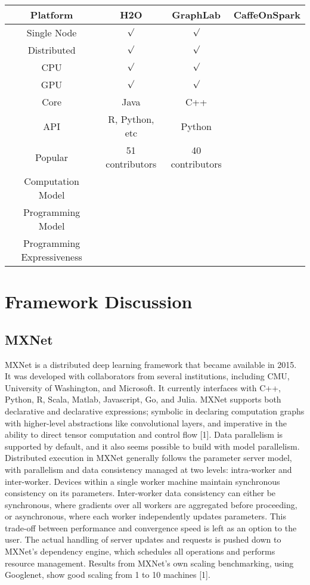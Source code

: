 \documentclass{article}
\begin{document}
\begin{tabular}{|c|c|c|c|}
\hline
Platform & H2O & GraphLab & CaffeOnSpark \\
\hline
Single Node & ${\surd}$ & ${\surd}$ &  \\
\hline
Distributed & ${\surd}$ & ${\surd}$ &  \\
\hline
CPU & ${\surd}$ & ${\surd}$ &  \\
\hline
GPU & ${\surd}$ & ${\surd}$ &  \\
\hline
Core & Java & C++ &  \\
\hline
API & R, Python, etc & Python &  \\
\hline
Popular & 51 contributors & 40 contributors &  \\
\hline
Computation Model & &  \\
\hline
Programming Model & & \\
\hline
Programming Expressiveness & & \\
\hline
\end{tabular}

\section{Framework Discussion}
\subsection{MXNet}
MXNet is a distributed deep learning framework that became available in 2015. It was developed with collaborators from several institutions, including CMU, University of Washington, and Microsoft. It currently interfaces with C++, Python, R, Scala, Matlab, Javascript, Go, and Julia. MXNet supports both declarative and declarative expressions; symbolic in declaring computation graphs with higher-level abstractions like convolutional layers, and imperative in the ability to direct tensor computation and control flow [1]. Data parallelism is supported by default, and it also seems possible to build with model parallelism. Distributed execution in MXNet generally follows the parameter server model, with parallelism and data consistency managed at two levels: intra-worker and inter-worker. Devices within a single worker machine maintain synchronous consistency on its parameters. Inter-worker data consistency can either be synchronous, where gradients over all workers are aggregated before proceeding, or asynchronous, where each worker independently updates parameters. This trade-off between performance and convergence speed is left as an option to the user. The actual handling of server updates and requests is pushed down to MXNet's dependency engine, which schedules all operations and performs resource management. Results from MXNet's own scaling benchmarking, using Googlenet, show good scaling from 1 to 10 machines [1]. 
\end{document}
